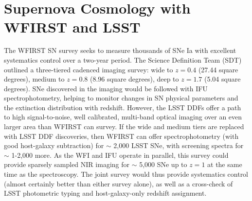 %
%

\section{Supernova Cosmology with WFIRST and LSST}
\def\secname{\chpname:supernovae}\label{sec:\secname}


%

The WFIRST SN survey seeks to measure thousands of SNe Ia with excellent systematics control over a two-year period. The Science Definition Team (SDT) outlined a three-tiered cadenced imaging survey: wide to $z=0.4$ (27.44 square degrees), medium to $z=0.8$ (8.96 square degrees), deep to $z=1.7$ (5.04 square degrees). SNe discovered in the imaging would be followed with IFU spectrophotometry, helping to monitor changes in SN physical parameters and the extinction distribution with redshift.
However, the LSST DDFs offer a path to high signal-to-noise, well calibrated, multi-band optical imaging over an even larger area than WFIRST can survey. If the wide and medium tiers are replaced with LSST DDF discoveries, then WFIRST can offer spectrophotometry (with good host-galaxy subtraction) for $\sim$ 2,000 LSST SNe, with screening spectra for $\sim$ 1-2,000 more. As the WFI and IFU operate in parallel, this survey could provide sparsely sampled NIR imaging for $\sim$ 5,000 SNe up to $z = 1$ at the same time as the spectroscopy. The joint survey would thus provide systematics control (almost certainly better than either survey alone), as well as a cross-check of LSST photometric typing and host-galaxy-only redshift assignment.


